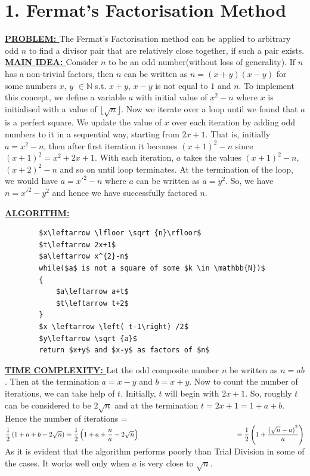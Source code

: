 \documentclass[11pt]{article}
\begin{document}
\section*{1. Fermat's Factorisation Method}

\begin{flushleft}
    \textbf{\underline{PROBLEM: }}The Fermat's Factorisation method can be applied to arbitrary odd $n$ to find a divisor pair that are relatively close together, if such a pair exists.
    \break\break
    \textbf{\underline{MAIN IDEA: }}\break
        Consider $n$ to be an odd number(without loss of generality). If $n$ has a non-trivial factors, then $n$ can be written as $n = (x+y)(x-y)$ for some numbers $x$, $y$ $\in \mathbb{N}$ s.t. $x+y$, $x-y$ is not equal to $1$ and $n$.\break\break
        To implement this concept, we define a variable $a$ with initial value of $x^{2}-n$ where $x$ is initialised with a value of $\lfloor \sqrt {n}\rfloor $. Now we iterate over a loop until we found that $a$ is a perfect square. We update the value of $x$ over each iteration by adding odd numbers to it in a sequential way, starting from $2x+1$.
        That is, initially $a = x^{2}-n$, then after first iteration it becomes $\left( x+1\right) ^{2}-n$ since $\left( x+1\right) ^{2}=x^{2}+2x+1$. With each iteration, $a$ takes the values $\left( x+1\right) ^{2}-n$, $\left( x+2\right) ^{2}-n$ and so on until loop terminates.
        At the termination of the loop, we would have $a = x'^{2}-n$ where $a$ can be written as $a=y^{2}$. So, we have $n=x'^{2}-y^{2}$ and hence we have successfully factored $n$.
        \break

    \textbf{\underline{ALGORITHM: }}
        \begin{lstlisting}
        $x\leftarrow \lfloor \sqrt {n}\rfloor$ 
        $t\leftarrow 2x+1$
        $a\leftarrow x^{2}-n$
        while($a$ is not a square of some $k \in \mathbb{N})$
        {
            $a\leftarrow a+t$
            $t\leftarrow t+2$
        }
        $x \leftarrow \left( t-1\right) /2$
        $y\leftarrow \sqrt {a}$
        return $x+y$ and $x-y$ as factors of $n$
        \end{lstlisting}
    
    \textbf{\underline{TIME COMPLEXITY: }}\break
        Let the odd composite number $n$ be written as $n=ab$. Then at the termination $a=x-y$ and $b=x+y$. Now to count the number of iterations, we can take help of $t$. Initially, $t$ will begin with $2x+1$. So, roughly $t$ can be considered to be $2\sqrt {n}$ and at the termination $t = 2x+1 = 1+a+b$.\break
        Hence the number of iterations  = $\dfrac {1}{2}\left( 1+a+b-2\sqrt {n}\right) = \dfrac {1}{2}\left( 1+a+\dfrac {n}{a}-2\sqrt {n}\right)\\ \;\;\;\;\;\;\;\;\;\;\;\;\;\;\;\;\;\;\;\;\;\;\;\;\;\;\;\;\;\;\;\;\;\;\;\;\;\;\;\;\;\;\;\;\;\;\;\;\;\;\;=
        \dfrac {1}{2}\left( 1+\dfrac {\left( \sqrt {n}-a\right) ^{2}}{a}\right) $ 
        \break\break
        As it is evident that the algorithm performs poorly than Trial Division in some of the cases. It works well only when $a$ is very close to $\sqrt{
        n}.$


\end{flushleft}
\end{document}
